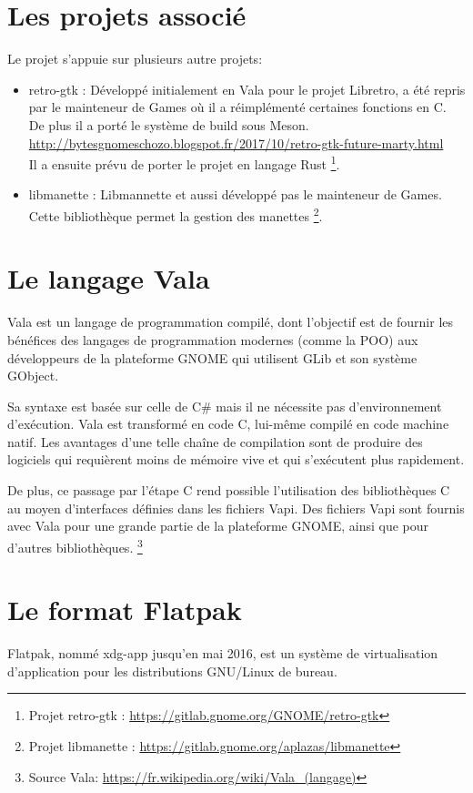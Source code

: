 \documentclass[12pt]{report}
\begin{document}
\section{Les projets associé}
Le projet s'appuie sur plusieurs autre projets:
\begin{itemize}
\item retro-gtk : Développé initialement en Vala pour le projet Libretro, a
  été repris par le mainteneur de Games où il a réimplémenté certaines
  fonctions en C. De plus il a porté le système de build sous Meson.\\
  \url{http://bytesgnomeschozo.blogspot.fr/2017/10/retro-gtk-future-marty.html}\\
  Il a ensuite prévu de porter le projet en langage Rust
  \footnote{Projet retro-gtk : \url{https://gitlab.gnome.org/GNOME/retro-gtk}}.
\item libmanette : Libmannette et aussi développé pas le mainteneur de Games. Cette bibliothèque
  permet la gestion des manettes
  \footnote{Projet libmanette : \url{https://gitlab.gnome.org/aplazas/libmanette}}.
\end{itemize}

\section{Le langage Vala}
Vala est un langage de programmation compilé, dont l'objectif est de
fournir les bénéfices des langages de programmation modernes (comme la
POO) aux développeurs de la plateforme GNOME qui utilisent GLib et son
système GObject.

Sa syntaxe est basée sur celle de C\# mais il ne nécessite pas
d'environnement d'exécution. Vala est transformé en code C, lui-même
compilé en code machine natif. Les avantages d'une telle chaîne de
compilation sont de produire des logiciels qui requièrent moins de
mémoire vive et qui s'exécutent plus rapidement.

De plus, ce passage par l'étape C rend possible l'utilisation des
bibliothèques C au moyen d'interfaces définies dans les fichiers
Vapi. Des fichiers Vapi sont fournis avec Vala pour une grande partie
de la plateforme GNOME, ainsi que pour d'autres bibliothèques.
\footnote{Source Vala: \url{https://fr.wikipedia.org/wiki/Vala_(langage)}}

\section{Le format Flatpak}
Flatpak, nommé xdg-app jusqu’en mai 2016, est un système de
virtualisation d’application pour les distributions GNU/Linux de
bureau.
\end{document}
